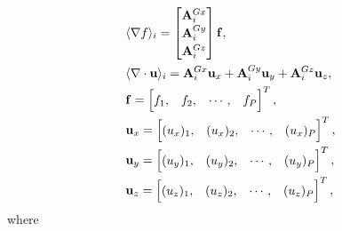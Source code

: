 \begin{align}\renewcommand{\arraystretch}{1.2}
&\langle \nabla f \rangle_i=
\begin{bmatrix} 
\mathbf{A}^{Gx}_i\\
\mathbf{A}^{Gy}_i\\
\mathbf{A}^{Gz}_i\\
\end{bmatrix}\mathbf{f}, \\ 
&\langle \nabla \cdot \mathbf{u} \rangle_i= 
\mathbf{A}^{Gx}_i \mathbf{u}_x+
\mathbf{A}^{Gy}_i \mathbf{u}_y+
\mathbf{A}^{Gz}_i \mathbf{u}_z, \label{eq:divergence_disc}\\
&\mathbf{f}= \begin{bmatrix}
f_1,&f_2,&\cdots,&f_{\nParticles}
\end{bmatrix}^T, \\
&\mathbf{u}_x= \begin{bmatrix}
(u_x)_{1},&(u_x)_{2},&\cdots,&(u_x)_{\nParticles}
\end{bmatrix}^T,\\
&\mathbf{u}_y= \begin{bmatrix}
(u_y)_{1},&(u_y)_{2},&\cdots,&(u_y)_{\nParticles}
\end{bmatrix}^T,\\
&\mathbf{u}_z= \begin{bmatrix}
(u_z)_{1}, & (u_z)_{2},&\cdots,& (u_z)_{\nParticles}
\end{bmatrix}^T, \label{eq:uxuyuz}
\end{align}
where 
